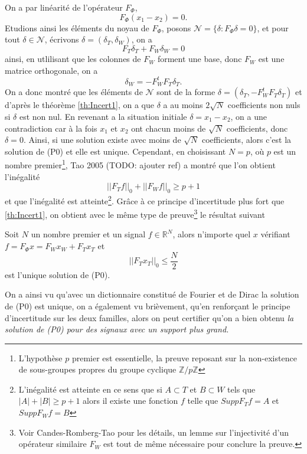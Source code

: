\begin{exemple}
	On a par linéarité de l'opérateur $F_\Phi$, 
	\begin{equation}
		F_\Phi( x_1 - x_2) = 0.
	\end{equation}
	Etudions ainsi les éléments du noyau de $F_\Phi$, posons $\mathcal{N} = \{\delta : F_\Phi \delta = 0\}$, et pour tout $\delta \in \mathcal{N}$, écrivons $\delta = (\delta_T, \delta_W)$, on a
	\begin{equation}
		F_T \delta_T + F_W \delta_W = 0
	\end{equation}
	ainsi, en utlilisant que les colonnes de $F_W$ forment une base, donc $F_W$ est une matrice orthogonale, on a 
	\begin{equation}\label{eq:structN}
		\delta_W = -F_W^t F_T \delta_T .
	\end{equation}
	On a donc montré que les éléments de $\mathcal{N}$ sont de la forme $\delta = (\delta_T, -F_W^t F_T \delta_T)$ et d'après le théorème \ref{th:Incert1}, on a que $\delta$ a au moins $2\sqrt{N}$ coefficients non nuls si $\delta$ est non nul. 
	En revenant a la situation initiale $\delta = x_1 - x_2$, on a une contradiction car à la fois $x_1$ et $x_2$ ont chacun moins de $\sqrt{N}$ coefficients, donc $\delta = 0$.
	Ainsi, si une solution existe avec moins de $\sqrt{N}$ coefficients, alors c'est la solution de (P0) et elle est unique.
	\newline
	Cependant, en choisissant $N = p$, où $p$ est un nombre premier\footnote{L'hypothèse $p$ premier est essentielle, la preuve reposant sur la non-existence de sous-groupes propres du groupe cyclique $\mathbb{Z}/p\mathbb{Z}$}, Tao 2005 (TODO: ajouter ref) a montré que l'on obtient l'inégalité
	\begin{equation}
		||F_T f||_0 + ||F_W f||_0 \geq p + 1
	\end{equation}
	et que l'inégalité est atteinte\footnote{L'inégalité est atteinte en ce sens que si $A\subset T$ et $B\subset W$ tels que $|A| + |B| \geq p+1$ alors il existe une fonction $f$ telle que $Supp F_T f = A$ et $Supp F_W f = B$}.
	Grâce à ce principe d'incertitude plus fort que \ref{th:Incert1}, on obtient avec le même type de preuve\footnote{Voir Candes-Romberg-Tao pour les détails, un lemme sur l'injectivité d'un opérateur similaire $F_W$ est tout de même nécessaire pour conclure la preuve.} le résultat suivant
	\begin{theoreme}
		Soit $N$ un nombre premier et un signal $f \in \mathbb{R}^N$, alors n'importe quel $x$ vérifiant $f = F_\Phi x = F_W x_W + F_T x_T$ et
		\begin{equation}\label{eq:Incert2}
		||F_T x_T||_0 \leq \frac{N}{2}
		\end{equation}
		est l'unique solution de (P0).
	\end{theoreme}
	On a ainsi vu qu'avec un dictionnaire constitué de Fourier et de Dirac la solution de (P0) est unique, on a également vu brièvement, qu'en renforçant le principe d'incertitude sur les deux familles, alors on peut certifier qu'on a bien obtenu \it{la} solution de (P0) pour des signaux avec un support plus grand.
\end{exemple}
